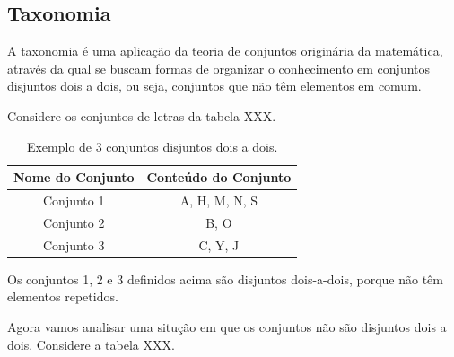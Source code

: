 \documentclass[
12pt,		%
openright,	%
twoside,  %
a4paper,			%
chapter=TITLE,		%
english,			%
french,				%
spanish,			%
brazil				%
]{USPSC-classe/USPSC}
\begin{document}
\subsection[Taxonomia]{Taxonomia}\label{Taxonomia}
A taxonomia \'e uma aplica\c{c}\~ao da teoria de conjuntos origin\'aria da matem\'atica, atrav\'es da qual se buscam formas de organizar o conhecimento em \textquotedbl conjuntos disjuntos dois a dois\textquotedbl , ou seja, conjuntos que n\~ao t\^em elementos em comum.














Considere os conjuntos de letras da tabela XXX.


















\begin{table}[htb]
\tiny
\caption{\label{f949aa902f1edcd8a77b86ea2247b8db48e4140e}Exemplo de 3 conjuntos disjuntos dois a dois.}

\centering
\begin{tabular}{|c|c|}
\hline
Nome do Conjunto  &  Conte\'udo do Conjunto \\
\hline
Conjunto 1  &  A, H, M, N, S \\
Conjunto 2  &  B, O \\
Conjunto 3  &  C, Y, J \\
\hline
\end{tabular}
\end{table}


Os conjuntos 1, 2 e 3 definidos acima s\~ao \textquotedbl disjuntos dois-a-dois\textquotedbl , porque n\~ao t\^em elementos repetidos.














Agora vamos analisar uma situ\c{c}\~ao em que os conjuntos n\~ao s\~ao disjuntos dois a dois. Considere a tabela XXX.
\end{document}
